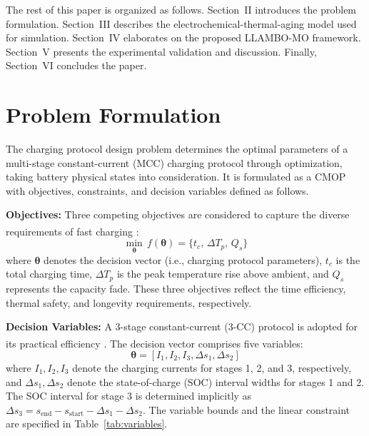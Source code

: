 \documentclass[lettersize,journal]{IEEEtran}
\let\OLDcite\cite
\renewcommand{\cite}[1]{\textsuperscript{\OLDcite{#1}}}
\begin{document}
The rest of this paper is organized as follows. Section~II introduces the problem formulation. Section~III describes the electrochemical-thermal-aging model used for simulation. Section~IV elaborates on the proposed LLAMBO-MO framework. Section~V presents the experimental validation and discussion. Finally, Section~VI concludes the paper.

\section{Problem Formulation}

The charging protocol design problem determines the optimal parameters of a multi-stage constant-current (MCC) charging protocol through optimization, taking battery physical states into consideration. It is formulated as a CMOP with objectives, constraints, and decision variables defined as follows.

\textbf{Objectives:} Three competing objectives are considered to capture the diverse requirements of fast charging \cite{ref17}:
\begin{equation}
\label{eq:obj}
\min_{\boldsymbol{\theta}} \, f(\boldsymbol{\theta}) = \{t_c, \, \Delta T_p, \, Q_s\}
\end{equation}
where $\boldsymbol{\theta}$ denotes the decision vector (i.e., charging protocol parameters), $t_c$ is the total charging time, $\Delta T_p$ is the peak temperature rise above ambient, and $Q_s$ represents the capacity fade. These three objectives reflect the time efficiency, thermal safety, and longevity requirements, respectively.

\textbf{Decision Variables:} A 3-stage constant-current (3-CC) protocol is adopted for its practical efficiency \cite{ref22}. The decision vector comprises five variables:
\begin{equation*}
\boldsymbol{\theta} = [I_1, I_2, I_3, \Delta s_1, \Delta s_2]
\end{equation*}
where $I_1, I_2, I_3$ denote the charging currents for stages 1, 2, and 3, respectively, and $\Delta s_1, \Delta s_2$ denote the state-of-charge (SOC) interval widths for stages 1 and 2. The SOC interval for stage 3 is determined implicitly as $\Delta s_3 = s_{\text{end}} - s_{\text{start}} - \Delta s_1 - \Delta s_2$. The variable bounds and the linear constraint are specified in Table~\ref{tab:variables}.
\end{document}
